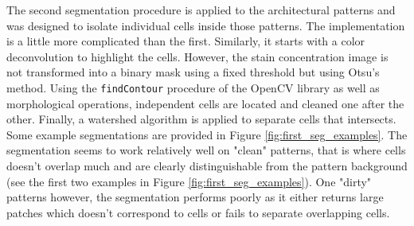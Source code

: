 The second segmentation procedure is applied to the architectural patterns and was designed to isolate individual cells inside those patterns. The implementation is a little more complicated than the first. Similarly, it starts with a color deconvolution to highlight the cells. However, the stain concentration image is not transformed into a binary mask using a fixed threshold but using Otsu's method. Using the \texttt{findContour} procedure of the OpenCV library as well as morphological operations, independent cells are located and cleaned one after the other. Finally, a watershed algorithm is applied to separate cells that intersects. Some example segmentations are provided in Figure \ref{fig:first_seg_examples}. The segmentation seems to work relatively well on "clean" patterns, that is where cells doesn't overlap much and are clearly distinguishable from the pattern background (see the first two examples in Figure \ref{fig:first_seg_examples}). One "dirty" patterns however, the segmentation performs poorly as it either returns large patches which doesn't correspond to cells or fails to separate overlapping cells.  

